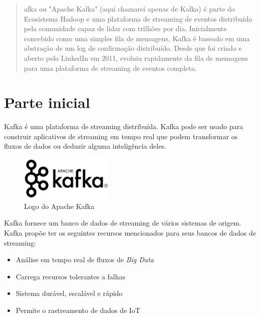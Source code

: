 \documentclass[a4paper,11pt]{article}
\begin{document}
	
	\maketitle %
	\thispagestyle{fancy} %
	
\begin{abstract}
	afka\cite{kafkaoficial} ou "Apache Kafka" (aqui chamarei apenas de Kafka) é parte do Ecosistema Hadoop e uma plataforma de streaming de eventos distribuída pela comunidade capaz de lidar com trilhões por dia. Inicialmente concebido como uma simples fila de mensagens, Kafka é baseado em uma abstração de um log de confirmação distribuído. Desde que foi criado e aberto pelo LinkedIn em 2011, evoluiu rapidamente da fila de mensagens para uma plataforma de streaming de eventos completa.
\end{abstract}

\section{Parte inicial}
Kafka é uma plataforma de streaming distribuída. Kafka pode ser usado para construir aplicativos de streaming em tempo real que podem transformar os fluxos de dados ou deduzir alguma inteligência deles. 

\begin{figure}[H]
	\centering
	\includegraphics[width=0.4\textwidth]{imagem/logo}
	\caption{Logo do Apache Kafka}
\end{figure}

Kafka fornece um banco de dados de streaming de vários sistemas de origem. Kafka propõe ter os seguintes recursos mencionados para seus bancos de dados de streaming: \vspace{-1em}
\begin{itemize}
	\item Análise em tempo real de fluxos de \textit{Big Data}
	\item Carrega recursos tolerantes a falhas
	\item Sistema durável, escalável e rápido
	\item Permite o rastreamento de dados de IoT 
\end{itemize}
\end{document}
